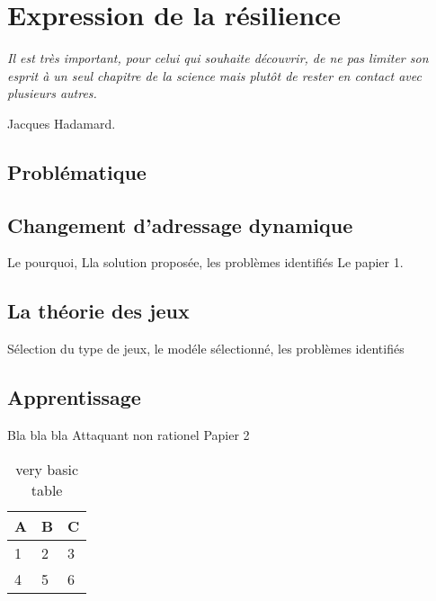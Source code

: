 \chapter{Expression de la r\'esilience} \label{CHAP4}
\smallskip
\hfill
\begin{minipage}[b]{8cm}
{\it Il est tr\`es important, pour celui qui souhaite d\'ecouvrir, de ne pas limiter son esprit \`a un seul chapitre de la
science mais plut\^ot de rester en contact avec plusieurs autres.}
\end{minipage}
\begin{flushright} Jacques Hadamard. \end{flushright}
\vskip 2cm


\section{Probl\'ematique}

\section{Changement d'adressage dynamique}
Le pourquoi, Lla solution propos\'ee, les probl\`emes identifi\'es
Le papier 1.


\section{La th\'eorie des jeux}
S\'election du type de jeux, le mod\'ele s\'electionn\'e, les probl\`emes identifi\'es


\section{Apprentissage}
Bla bla bla
Attaquant non rationel 
Papier 2


\begin{table}[h]
\centering
\begin{tabular}{l | l | l}
A & B & C \\
\hline
1 & 2 & 3 \\
4 & 5 & 6
\end{tabular}
\caption{very basic table}
\label{tab:abc}
\end{table}

